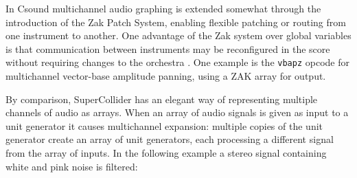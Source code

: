 \documentclass[twoside,a4paper]{article}
\begin{document}


In Csound multichannel audio graphing is extended somewhat through the introduction of the Zak Patch System, enabling flexible patching or routing from one instrument to another. One advantage of the Zak system over global variables is that communication between instruments may be reconfigured in the score without requiring changes to the orchestra \cite{Mikelson:2000}. One example is the \texttt{vbapz} opcode for multichannel vector-base amplitude panning, using a ZAK array for output.

By comparison, SuperCollider has an elegant way of representing multiple channels of audio as arrays. When an array of audio signals is given as input to a unit generator it causes multichannel expansion: multiple copies of the unit generator create an array of unit generators, each processing a different signal from the array of inputs. In the following example a stereo signal containing white and pink noise is filtered:
\end{document}

